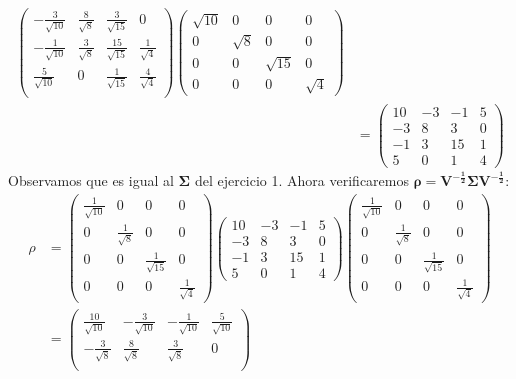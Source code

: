 \begin{sol}
\begin{align*}
\begin{pmatrix}
-\frac{3}{\sqrt{10}} & \frac{8}{\sqrt{8}} & \frac{3}{\sqrt{15}} & 0 \\
-\frac{1}{\sqrt{10}} & \frac{3}{\sqrt{8}} & \frac{15}{\sqrt{15}} & \frac{1}{\sqrt{4}} \\
\frac{5}{\sqrt{10}} & 0 & \frac{1}{\sqrt{15}} & \frac{4}{\sqrt{4}} \\
\end{pmatrix} 
\begin{pmatrix}
\sqrt{10} & 0 & 0 & 0\\
0 & \sqrt{8} & 0 & 0\\
0 & 0 & \sqrt{15} & 0\\
0 &0 &0 & \sqrt{4}
\end{pmatrix}\\
&=\begin{pmatrix}
10&-3&-1&5\\
-3&8&3&0\\
-1&3&15&1\\
5&0&1&4
\end{pmatrix}
\end{align*}
Observamos que es igual al $\mathbf{\Sigma}$ del ejercicio 1. Ahora verificaremos $\mathbf{\rho}=\mathbf{V^{-\frac{1}{2}} \Sigma V^{-\frac{1}{2}}}$:
\begin{align*}
\rho &= \begin{pmatrix}
\frac{1}{\sqrt{10}} & 0 & 0 & 0\\
0 &\frac{1}{\sqrt{8}}  & 0 & 0\\
0 & 0 & \frac{1}{\sqrt{15}}  & 0\\
0 &0 &0 & \frac{1}{\sqrt{4}} 
\end{pmatrix}
\begin{pmatrix}
10&-3&-1&5\\
-3&8&3&0\\
-1&3&15&1\\
5&0&1&4
\end{pmatrix}
\begin{pmatrix}
\frac{1}{\sqrt{10}} & 0 & 0 & 0\\
0 &\frac{1}{\sqrt{8}}  & 0 & 0\\
0 & 0 & \frac{1}{\sqrt{15}}  & 0\\
0 &0 &0 & \frac{1}{\sqrt{4}} 
\end{pmatrix} \\
&= 
\begin{pmatrix}
\frac{10}{\sqrt{10}} & -\frac{3}{\sqrt{10}} & -\frac{1}{\sqrt{10}} & \frac{5}{\sqrt{10}} \\
-\frac{3}{\sqrt{8}} & \frac{8}{\sqrt{8}} & \frac{3}{\sqrt{8}} & 0 \\

\end{pmatrix}
\end{align*}
\end{sol}
